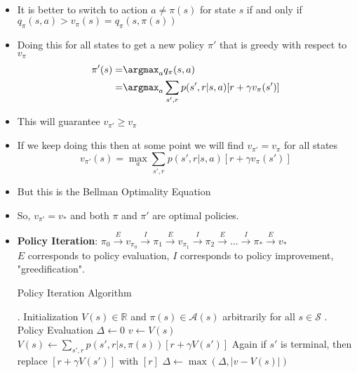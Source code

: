 \documentclass[a4paper]{article}
\begin{document}
\begin{itemize}
\begin{equation*}
\begin{split}
        \end{split}
    \end{equation*}
    \item It is better to switch to action $a\neq \pi(s)$ for state $s$ if and only if $q_\pi(s,a)>v_\pi(s)=q_\pi(s,\pi(s))$
    \item Doing this for all states to get a new policy $\pi'$ that is greedy with respect to $v_\pi$
    \begin{equation*}
        \begin{split}
            \pi'(s)=&\argmax_aq_\pi(s,a)\\
            =&\argmax_a\sum_{s',r}p(s',r|s,a)[r+\gamma v_\pi(s')]
        \end{split}
    \end{equation*}
    \item This will guarantee $v_{\pi'}\geq v_\pi$
    \item If we keep doing this then at some point we will find $v_{\pi'}=v_\pi$ for all states
    \begin{equation*}
        v_{\pi'}(s)=\max_a\sum_{s',r}p(s',r|s,a)[r+\gamma v_\pi(s')]
    \end{equation*}
    \item But this is the Bellman Optimality Equation
    \item So, $v_{\pi'}=v_*$ and both $\pi$ and $\pi'$ are optimal policies.
    \item \textbf{Policy Iteration}: $\pi_0\xrightarrow{E}v_{\pi_0}\xrightarrow{I}\pi_1\xrightarrow{E}v_{\pi_1}\xrightarrow{I}\pi_2\xrightarrow{E}...\xrightarrow{I}\pi_*\xrightarrow{E}v_*$\\
    $E$ corresponds to policy evaluation, $I$ corresponds to policy improvement, "greedification".
    \begin{algorithm}[H]
        \caption{Policy Iteration Algorithm}
        \begin{algorithmic}[1]
            . Initialization
            \State $V(s)\in \mathbb{R}$ and $\pi(s)\in \mathcal{A}(s)$ arbitrarily for all $s\in \mathcal{S}$
            \Statex
            \Loop
                . Policy Evaluation
                \Repeat
                    \State $\Delta \gets 0$
                        \State $v\gets V(s)$
                        \State $V(s)\gets \sum_{s',r}p(s',r|s,\pi(s))[r+\gamma V(s')]$
                        \LComment Again if $s'$ is terminal, then replace $[r+\gamma V(s')]$ with $[r]$
                        \State $\Delta \gets \max(\Delta,\lvert v-V(s)\rvert)$

\end{algorithmic}
\end{algorithm}
\end{itemize}
\end{document}
